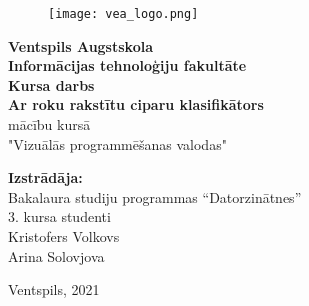 \begin{titlepage}
    \begin{center}
        \begin{figure}[H]
            \centering
            \texttt{[image: vea\_logo.png]}
        \end{figure}
        \large
        \textbf{Ventspils Augstskola \\Informācijas tehnoloģiju fakultāte}
        \vspace*{4cm}
        \\
        \textbf{Kursa darbs} \\
        \LARGE
        \textbf{Ar roku rakstītu ciparu klasifikātors}
        \vspace{0.5cm}
        \large
        \\
        mācību kursā \\ "Vizuālās programmēšanas valodas"
    \end{center}

    \vspace{2cm}

    \begin{flushright}
        \normalsize
        \textbf{Izstrādāja:}\\
        Bakalaura studiju programmas “Datorzinātnes”\\
        3. kursa studenti\\
        Kristofers Volkovs \\
        Arina Solovjova \\
    \end{flushright}

    \vfill

    \begin{center}
        \Large
        Ventspils, 2021
    \end{center}

\end{titlepage}